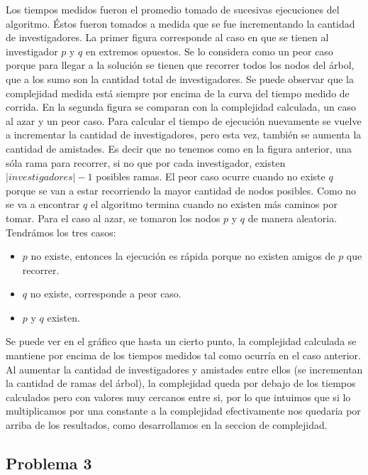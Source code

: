 \documentclass[12pt, a4paper,english,spanish]{article}
\begin{document}
Los tiempos medidos fueron el promedio tomado de sucesivas ejecuciones del algoritmo. \'Estos fueron tomados a medida que se fue incrementando la cantidad de investigadores.   
La primer figura corresponde al caso en que se tienen al investigador $p$ y $q$ en extremos opuestos. Se lo considera como un peor caso porque para llegar a la soluci\'on se tienen que recorrer todos los nodos del \'arbol, que a los sumo son la cantidad total de investigadores. Se puede observar que la complejidad medida est\'a siempre por encima de la curva del tiempo medido de corrida. 
En la segunda figura se comparan con la complejidad calculada, un caso al azar y un peor caso. 
Para calcular el tiempo de ejecuci\'on nuevamente se vuelve a incrementar la cantidad de investigadores, pero esta vez, tambi\'en se aumenta la cantidad de amistades. Es decir que no tenemos como en la figura anterior, una s\'ola rama para recorrer, si no que por cada investigador, existen $|investigadores|-1$ posibles ramas. 
El peor caso ocurre cuando no existe $q$ porque se van a estar recorriendo la mayor cantidad de nodos posibles. Como no se va a encontrar $q$ el algoritmo termina cuando no existen m\'as caminos por tomar. 
Para el caso al azar, se tomaron los nodos $p$ y $q$ de manera aleatoria. Tendr\'amos los tres casos:
\begin{itemize}
\item $p$ no existe, entonces la ejecuci\'on es r\'apida porque no existen amigos de $p$ que recorrer.
\item $q$ no existe, corresponde a peor caso.
\item $p$ y $q$ existen. 
\end{itemize}
Se puede ver en el gr\'afico que hasta un cierto punto, la complejidad calculada se mantiene por encima de los tiempos medidos tal como ocurr\'ia en el caso anterior.
Al aumentar la cantidad de investigadores y amistades entre ellos (se incrementan la cantidad de ramas del \'arbol), la complejidad queda por debajo de los tiempos calculados pero con valores muy cercanos entre si, por lo que intuimos que si lo multiplicamos por una constante a la complejidad efectivamente nos quedaria por arriba de los resultados, como desarrollamos en la seccion de complejidad.


\subsection*{Problema 3}
\end{document}
